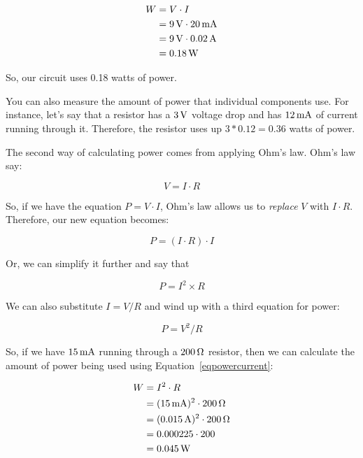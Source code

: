 \begin{align*}
W &= V\cdot I \\
  &= 9\,\si{\volt}\cdot 20\,\si{\milli\ampere}  \\
  &= 9\,\si{\volt}\cdot 0.02\,\si{\ampere} \\
  &= 0.18\,\si{\watt}
\end{align*}

So, our circuit uses 0.18 watts of power.

You can also measure the amount of power that individual components use.
For instance, let's say that a resistor has a $3\,\si{\volt}$ voltage drop and has $12\,\si{\milli\ampere}$ of current running through it.
Therefore, the resistor uses up $3 * 0.12 = 0.36$ watts of power.

The second way of calculating power comes from applying Ohm's law.
Ohm's law say:

\begin{equation}
V = I\cdot R
\end{equation}

So, if we have the equation $P = V\cdot I$, Ohm's law allows us to \emph{replace} $V$ with $I\cdot R$.
Therefore, our new equation becomes:

\begin{equation}
P = (I\cdot R)\cdot I
\end{equation}

Or, we can simplify it further and say that

\begin{equation}
\label{eqpowercurrent}
P = I^2\times R
\end{equation}

We can also substitute $I = V / R$ and wind up with a third equation for power:

\begin{equation}
\label{eqpowervr}
P = V^2 / R
\end{equation}

So, if we have $15\,\si{\milli\ampere}$ running through a $200\,\si{\ohm}$ resistor, then we can calculate the amount of power being used using Equation~\ref{eqpowercurrent}:

\begin{align*}
W &= I^2\cdot R \\
  &= (15\,\si{\milli\ampere})^2\cdot 200\,\si{\ohm} \\
  &= (0.015\,\si{\ampere})^2\cdot 200\,\si{\ohm} \\
  &= 0.000225\cdot 200 \\
  &= 0.045\,\si{\watt}
\end{align*}

